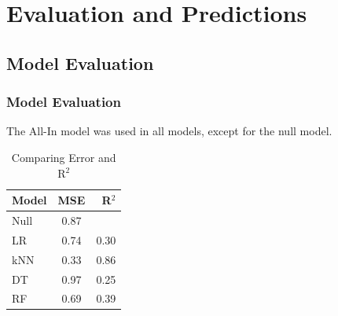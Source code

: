 \documentclass{beamer}
\begin{document}
	
	\section{Evaluation and Predictions}
		\subsection{Model Evaluation}
		
	\begin{frame}
		\frametitle{Model Evaluation}
			\begin{center}
		The All-In model was used in all models, except for the null model.  
		\end{center}
\begin{table}[h!]
	\begin{center}
		\caption{Comparing Error and R$^2$}
		\label{tab:Comparing Methods}
		\begin{tabular}{l|c|r} %
			\textbf{Model} & \textbf{MSE} & \textbf{R$^2$}\\
			\hline
			Null & 0.87 & \\
			LR & 0.74 & 0.30\\
			kNN & 0.33 & 0.86\\
			DT & 0.97 & 0.25\\
			RF & 0.69 & 0.39\\
		\end{tabular}
	\end{center}
\end{table}
	\end{frame}
\end{document}
